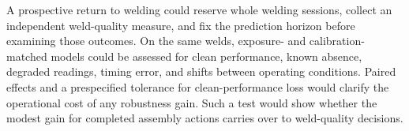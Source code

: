 A prospective return to welding could reserve whole welding sessions, collect an independent weld-quality measure, and fix the prediction horizon before examining those outcomes. On the same welds, exposure- and calibration-matched models could be assessed for clean performance, known absence, degraded readings, timing error, and shifts between operating conditions. Paired effects and a prespecified tolerance for clean-performance loss would clarify the operational cost of any robustness gain. Such a test would show whether the modest gain for completed assembly actions carries over to weld-quality decisions.
